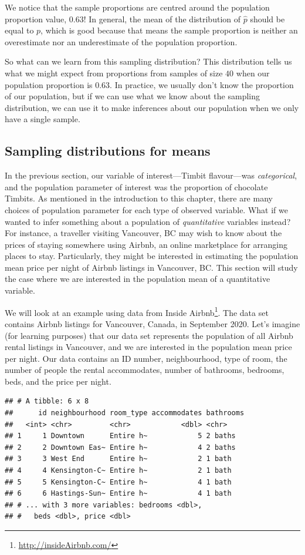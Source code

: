 \documentclass[
]{krantz}
\renewcommand{\href}[2]{#2\footnote{\url{#1}}}
\begin{document}
We notice that the sample proportions are centred around the population proportion value, 0.63! In general, the mean of the distribution of \(\hat{p}\) should be equal to \(p\), which is good because that means the sample proportion is neither an overestimate nor an underestimate of the population proportion.

So what can we learn from this sampling distribution? This distribution tells us what we might expect from proportions from samples of size \(40\) when our population proportion is 0.63. In practice, we usually don't know the proportion of our population, but if we can use what we know about the sampling distribution, we can use it to make inferences about our population when we only have a single sample.

\hypertarget{sampling-distributions-for-means}{%
\subsection{Sampling distributions for means}\label{sampling-distributions-for-means}}

In the previous section, our variable of interest---Timbit flavour---was
\emph{categorical}, and the population parameter of interest was the proportion of chocolate
Timbits. As mentioned in the introduction to this chapter, there are many choices of population parameter for each type of observed variable. What if we wanted to infer something about a population of \emph{quantitative} variables instead? For instance, a traveller visiting Vancouver, BC may wish to know about the prices of staying somewhere using Airbnb, an online marketplace for arranging places to stay. Particularly, they might be interested in estimating the population mean price per night of Airbnb listings in Vancouver, BC. This section will study the case where we are interested in the population mean of a quantitative variable.

We will look at an example using data from \href{http://insideAirbnb.com/}{Inside Airbnb}. The data set contains Airbnb listings for Vancouver, Canada, in September 2020. Let's imagine (for learning purposes) that our data set represents the population of all Airbnb rental listings in Vancouver, and we are interested in the population mean price per night.
Our data contains an ID number, neighbourhood,
type of room, the number of people the rental accommodates, number of bathrooms, bedrooms, beds, and the price per night.

\begin{verbatim}
## # A tibble: 6 x 8
##      id neighbourhood room_type accommodates bathrooms
##   <int> <chr>         <chr>            <dbl> <chr>    
## 1     1 Downtown      Entire h~            5 2 baths  
## 2     2 Downtown Eas~ Entire h~            4 2 baths  
## 3     3 West End      Entire h~            2 1 bath   
## 4     4 Kensington-C~ Entire h~            2 1 bath   
## 5     5 Kensington-C~ Entire h~            4 1 bath   
## 6     6 Hastings-Sun~ Entire h~            4 1 bath   
## # ... with 3 more variables: bedrooms <dbl>,
## #   beds <dbl>, price <dbl>
\end{verbatim}
\end{document}
